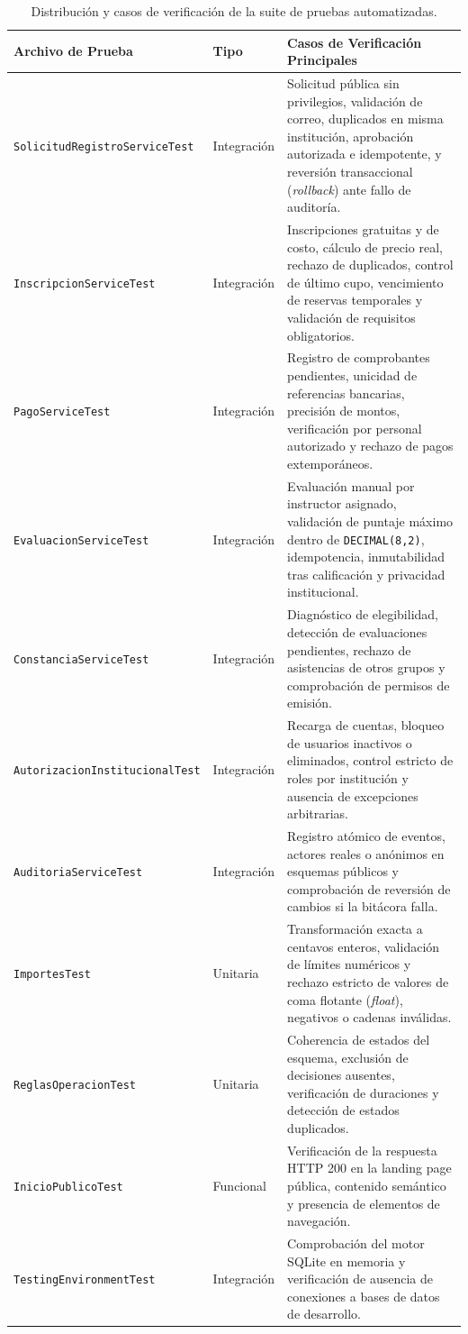 \begin{table}[htbp]
\centering
\caption{Distribución y casos de verificación de la suite de pruebas automatizadas.}
\label{tabla:cobertura_pruebas}
\small
\begin{tabularx}{\textwidth}{|p{4.2cm}|p{1.8cm}|X|}
\hline
\rowcolor[gray]{0.9}
\textbf{Archivo de Prueba} & \textbf{Tipo} & \textbf{Casos de Verificación Principales} \\
\hline
\texttt{SolicitudRegistroServiceTest} & Integración & Solicitud pública sin privilegios, validación de correo, duplicados en misma institución, aprobación autorizada e idempotente, y reversión transaccional (\textit{rollback}) ante fallo de auditoría. \\
\hline
\texttt{InscripcionServiceTest} & Integración & Inscripciones gratuitas y de costo, cálculo de precio real, rechazo de duplicados, control de último cupo, vencimiento de reservas temporales y validación de requisitos obligatorios. \\
\hline
\texttt{PagoServiceTest} & Integración & Registro de comprobantes pendientes, unicidad de referencias bancarias, precisión de montos, verificación por personal autorizado y rechazo de pagos extemporáneos. \\
\hline
\texttt{EvaluacionServiceTest} & Integración & Evaluación manual por instructor asignado, validación de puntaje máximo dentro de \texttt{DECIMAL(8,2)}, idempotencia, inmutabilidad tras calificación y privacidad institucional. \\
\hline
\texttt{ConstanciaServiceTest} & Integración & Diagnóstico de elegibilidad, detección de evaluaciones pendientes, rechazo de asistencias de otros grupos y comprobación de permisos de emisión. \\
\hline
\texttt{AutorizacionInstitucionalTest} & Integración & Recarga de cuentas, bloqueo de usuarios inactivos o eliminados, control estricto de roles por institución y ausencia de excepciones arbitrarias. \\
\hline
\texttt{AuditoriaServiceTest} & Integración & Registro atómico de eventos, actores reales o anónimos en esquemas públicos y comprobación de reversión de cambios si la bitácora falla. \\
\hline
\texttt{ImportesTest} & Unitaria & Transformación exacta a centavos enteros, validación de límites numéricos y rechazo estricto de valores de coma flotante (\textit{float}), negativos o cadenas inválidas. \\
\hline
\texttt{ReglasOperacionTest} & Unitaria & Coherencia de estados del esquema, exclusión de decisiones ausentes, verificación de duraciones y detección de estados duplicados. \\
\hline
\texttt{InicioPublicoTest} & Funcional & Verificación de la respuesta HTTP 200 en la landing page pública, contenido semántico y presencia de elementos de navegación. \\
\hline
\texttt{TestingEnvironmentTest} & Integración & Comprobación del motor SQLite en memoria y verificación de ausencia de conexiones a bases de datos de desarrollo. \\
\hline
\end{tabularx}
\end{table}

